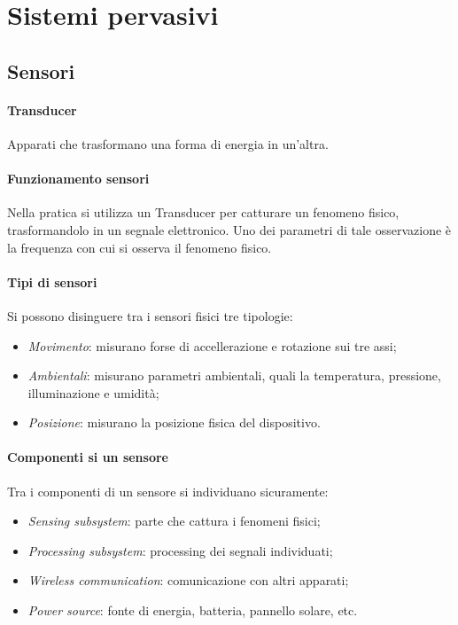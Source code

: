 \section{Sistemi pervasivi}

\subsection{Sensori}

\paragraph{Transducer}
Apparati che trasformano una forma di energia in un'altra.

\paragraph{Funzionamento sensori}
Nella pratica si utilizza un Transducer per catturare
un fenomeno fisico, trasformandolo in un segnale elettronico.
Uno dei parametri di tale osservazione è la frequenza con 
cui si osserva il fenomeno fisico.

\paragraph{Tipi di sensori}
Si possono disinguere tra i sensori fisici tre tipologie:
\begin{itemize}
    \item \emph{Movimento}: misurano forse di accellerazione 
    e rotazione sui tre assi;
    \item \emph{Ambientali}: misurano parametri ambientali, 
    quali la temperatura, pressione, illuminazione e umidità;
    \item \emph{Posizione}: misurano la posizione fisica del 
    dispositivo.
\end{itemize}

\paragraph{Componenti si un sensore}
Tra i componenti di un sensore si individuano sicuramente:
\begin{itemize}
    \item \emph{Sensing subsystem}: parte che cattura i fenomeni
    fisici;
    \item \emph{Processing subsystem}: processing dei segnali individuati;
    \item \emph{Wireless communication}: comunicazione con altri apparati;
    \item \emph{Power source}: fonte di energia, batteria, pannello solare, etc.
\end{itemize}

